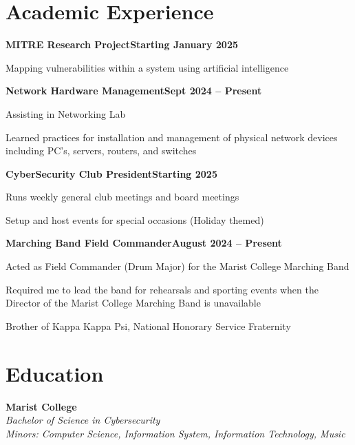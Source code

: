 \documentclass[letterpaper,10pt]{article}
\newcommand{\heading}[2]{
  \hspace{10pt}#1\hfill#2\\
}
\newcommand{\headingBf}[2]{
  \heading{\textbf{#1}}{\textbf{#2}}
}
\newcommand{\headingIt}[2]{
  \heading{\textit{#1}}{\textit{#2}}
}
\newenvironment{resume_list}{
  \vspace{-7pt}
  \begin{itemize}[itemsep=-2px, parsep=1pt, leftmargin=30pt]
}{
  \end{itemize}
}
\begin{document}
  \section{Academic Experience}

  \headingBf{MITRE Research Project}{Starting January 2025}
  \begin{resume_list}
    \item Mapping vulnerabilities within a system using artificial intelligence
  \end{resume_list}

  \headingBf{Network Hardware Management}{Sept 2024 -- Present}
  \begin{resume_list}
    \item Assisting in Networking Lab 
    \item Learned practices for installation and management of physical network devices including PC’s, servers, routers, and switches 
  \end{resume_list}

   \headingBf{CyberSecurity Club President}{Starting 2025}
  \begin{resume_list}
        \item Runs weekly general club meetings and board meetings
        \item Setup and host events for special occasions (Holiday themed)
  \end{resume_list}

   \headingBf{Marching Band Field Commander}{August 2024 -- Present}
  \begin{resume_list}
      \item Acted as Field Commander (Drum Major) for the Marist College Marching Band  
    \item Required me to lead the band for rehearsals and sporting events when the Director of the Marist College Marching Band is unavailable  
    \item Brother of Kappa Kappa Psi, National Honorary Service Fraternity 
  \end{resume_list}

  \section{Education}

  \headingBf{Marist College}{} 
  \headingIt{Bachelor of Science in Cybersecurity}{}
  \headingIt{Minors: Computer Science, Information System, Information Technology, Music}{}
\end{document}
